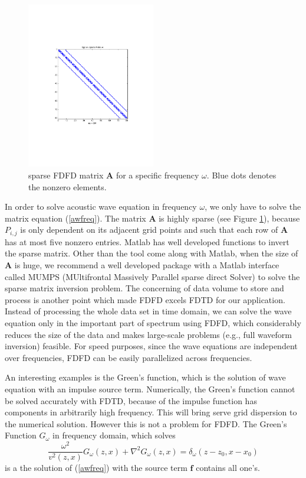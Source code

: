 \documentclass[11pt]{article}
\newcommand{\bA}{\boldsymbol{A}}
\newcommand{\bff}{\boldsymbol{f}}
\theoremstyle{plain}
\theoremstyle{definition}
\theoremstyle{remark}
\numberwithin{equation}{section}
\begin{document}
  \begin{figure}
  \centering
  \includegraphics[width=0.5\textwidth]{Fig/FDFDMatrixA.pdf}
  \caption{sparse FDFD matrix $\bA$ for a specific frequency $\omega$. Blue dots denotes the nonzero elements.}
  \label{fig:SparseA}
  \end{figure}
  In order to solve acoustic wave equation in frequency $\omega$, we only have to solve the matrix equation (\ref{awfreq}). The 
  matrix $\bA$ is highly sparse (see Figure \ref{fig:SparseA}), because $P_{i,j}$ is only dependent on its adjacent grid points and such that each row of $\bA$ has at most five nonzero entries.
  Matlab has well developed functions to invert the sparse matrix. Other than the tool come along with Matlab, when the size of $\bA$ is huge, we recommend a well developed package with a Matlab interface called MUMPS (MUltifrontal Massively Parallel sparse direct Solver) to solve the sparse matrix inversion problem. 
 The concerning of data volume to store and process is another point which made FDFD excels FDTD for our application. Instead of processing the whole data set in time domain, we can solve the wave equation only in the important part of spectrum using FDFD, which considerably reduces the size of the data and makes large-scale problems (e.g., full waveform inversion) feasible. For speed purposes, since the wave equations are independent over frequencies, FDFD can be easily parallelized across frequencies.

An interesting examples is the Green's function, which is the solution of wave equation with an impulse source term. Numerically,
the Green's function cannot be solved accurately with FDTD, because of the impulse function has components in arbitrarily high
frequency. This will bring serve grid dispersion to the numerical solution. However this is not a problem for FDFD. The Green's Function 
$G_{\omega}$ in frequency domain, which solves  
  \begin{equation}
  \frac{\omega^2}{v^2(z, x)}G_{\omega}(z, x) + \nabla^2 G_{\omega}(z, x) = \delta_{\omega}(z-z_0, x-x_0)
  \end{equation}
  is a the solution of (\ref{awfreq}) with the source term $\bff$ contains all one's.
  
\end{document}
